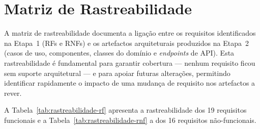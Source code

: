 \section{Matriz de Rastreabilidade}
\label{sec:rastreabilidade}

    A matriz de rastreabilidade documenta a ligação entre os requisitos identificados na Etapa~1 (RFs e RNFs) e os artefactos arquiteturais produzidos na Etapa~2 (casos de uso, componentes, classes do domínio e \textit{endpoints} de API). Esta rastreabilidade é fundamental para garantir cobertura --- nenhum requisito ficou sem suporte arquitetural --- e para apoiar futuras alterações, permitindo identificar rapidamente o impacto de uma mudança de requisito nos artefactos a rever.

    A Tabela~\ref{tab:rastreabilidade-rf} apresenta a rastreabilidade dos 19 requisitos funcionais e a Tabela~\ref{tab:rastreabilidade-rnf} a dos 16 requisitos não-funcionais.

